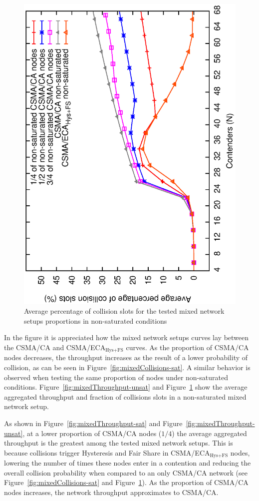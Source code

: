 	\begin{figure}[tb!!!]
		\centering
		\includegraphics[width=0.7\linewidth,angle=-90]{figures/unsaturated/mixed/collisions-mixed/collisions-mixed-unsaturated.eps}
		\caption{Average percentage of collision slots for the tested mixed network setups proportions in non-saturated conditions}
		\label{fig:mixCollisions-unsat}
	\end{figure}
	
	In the figure it is appreciated how the mixed network setups curves lay between the CSMA/CA and CSMA/ECA$_{\text{Hys+FS}}$ curves. As the proportion of CSMA/CA nodes decreases, the throughput increases as the result of a lower probability of collision, as can be seen in Figure~\ref{fig:mixedCollisions-sat}. A similar behavior is observed when testing the same proportion of nodes under non-saturated conditions. Figure~\ref{fig:mixedThroughput-unsat} and Figure~\ref{fig:mixCollisions-unsat} show the average aggregated throughput and fraction of collisions slots in a non-saturated mixed network setup.
	
	As shown in Figure~\ref{fig:mixedThroughput-sat} and Figure~\ref{fig:mixedThroughput-unsat}, at a lower proportion of CSMA/CA nodes ($1/4$) the average aggregated throughput is the greatest among the tested mixed network setups. This is because collisions trigger Hysteresis and Fair Share in CSMA/ECA$_{\text{Hys+FS}}$ nodes, lowering the number of times these nodes enter in a contention and reducing the overall collision probability when compared to an only CSMA/CA network (see Figure~\ref{fig:mixedCollisions-sat} and Figure~\ref{fig:mixCollisions-unsat}). As the proportion of CSMA/CA nodes increases, the network throughput approximates to CSMA/CA.	
